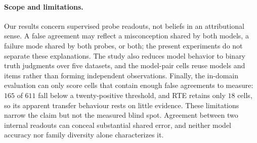 \paragraph{Scope and limitations.}
Our results concern supervised probe readouts, not beliefs in an attributional
sense. A false agreement may reflect a misconception shared by both models, a
failure mode shared by both probes, or both; the present experiments do not
separate these explanations. The study also reduces model behavior to binary
truth judgments over five datasets, and the model-pair cells reuse models and
items rather than forming independent observations. Finally, the in-domain
evaluation can only score cells that contain enough false agreements to measure:
$165$ of $611$ fall below a twenty-positive threshold, and RTE retains only $18$
cells, so its apparent transfer behaviour rests on little evidence. These limitations
narrow the claim but not the measured blind spot. Agreement between two internal
readouts can conceal substantial shared error, and neither model accuracy nor
family diversity alone characterizes it.
